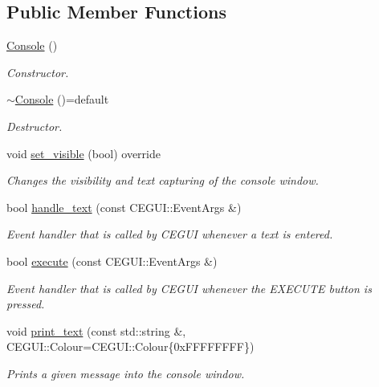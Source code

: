 \subsection*{Public Member Functions}
\begin{DoxyCompactItemize}
\item 
\hyperlink{class_console_aba16cfd9f0894eb1312b1bc1155b6646}{Console} ()
\begin{DoxyCompactList}\small\item\em Constructor. \end{DoxyCompactList}\item 
\hyperlink{class_console_a2b86176c87730295868220533308c8ab}{$\sim$\+Console} ()=default
\begin{DoxyCompactList}\small\item\em Destructor. \end{DoxyCompactList}\item 
void \hyperlink{class_console_a501dafcea40b76808dec9fce5817f54a}{set\+\_\+visible} (bool) override
\begin{DoxyCompactList}\small\item\em Changes the visibility and text capturing of the console window. \end{DoxyCompactList}\item 
bool \hyperlink{class_console_aa63491208fe0a61c7c9f6f289f0c2ed3}{handle\+\_\+text} (const C\+E\+G\+U\+I\+::\+Event\+Args \&)
\begin{DoxyCompactList}\small\item\em Event handler that is called by C\+E\+G\+UI whenever a text is entered. \end{DoxyCompactList}\item 
bool \hyperlink{class_console_a619330d0fb8ad4d4f3e38dccab9d2e7a}{execute} (const C\+E\+G\+U\+I\+::\+Event\+Args \&)
\begin{DoxyCompactList}\small\item\em Event handler that is called by C\+E\+G\+UI whenever the E\+X\+E\+C\+U\+TE button is pressed. \end{DoxyCompactList}\item 
void \hyperlink{class_console_a59cea40f9d5fb4acc894cb3a474ca003}{print\+\_\+text} (const std\+::string \&, C\+E\+G\+U\+I\+::\+Colour=C\+E\+G\+U\+I\+::\+Colour\{0x\+F\+F\+F\+F\+F\+F\+F\+F\})
\begin{DoxyCompactList}\small\item\em Prints a given message into the console window. \end{DoxyCompactList}\item 

\end{DoxyCompactItemize}
